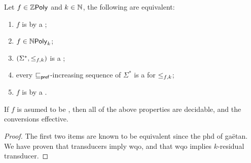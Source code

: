 \begin{theorem}
    \label{non-commutative-npoly:thm}
    Let $f \in \ZPoly$ and $k \in \mathbb{N}$,
    the following are equivalent:
    \begin{enumerate}
        \item $f$ is 
            by a ;
        \item $f \in \NPoly[k]$;
        \item $(\Sigma^*, \mathrel{\leq_{{f},{k}}})$ is a
            ;
        \item every $\sqsubseteq_{\mathsf{pref}}$-increasing sequence
            of $\Sigma^*$  is a 
            for $\mathrel{\leq_{{f},{k}}}$;
        \item $f$ is  by a
            .
    \end{enumerate}
    If $f$ is asumed to be , then all of the above
    properties are decidable, and the conversions effective.
\end{theorem}
\begin{proof}
    The first two items are known to be equivalent since 
    the phd of gaëtan.
    We have proven that transducers imply
    wqo, and that wqo implies $k$-residual transducer.
\end{proof}


